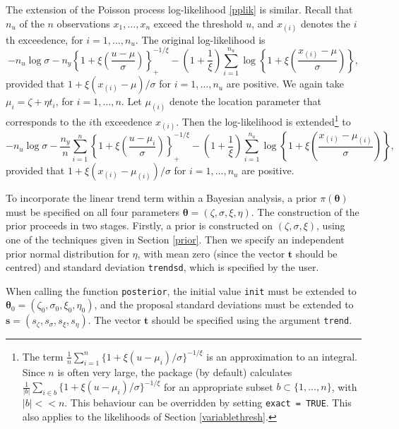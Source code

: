 \documentclass[11pt,a4paper]{article}
\newcommand{\bs}{\boldsymbol}
\begin{document}
The extension of the Poisson process log-likelihood \eqref{pplik} is similar.
Recall that $n_u$ of the $n$ observations $x_1,\dots,x_n$ exceed the threshold $u$, and $x_{(i)}$ denotes the $i$th exceedence, for $i=1,\dots,n_u$.
The original log-likelihood is
\begin{equation}
-n_u\log \sigma - n_y\left\{1 + \xi\left(\frac{u-\mu}{\sigma}\right)\right\}_{+}^{-1/\xi} - \left(1+\frac{1}{\xi}\right) \sum_{i=1}^{n_u} \log\left\{1 + \xi\left(\frac{x_{(i)}-\mu}{\sigma}\right)\right\},
\label{pplik2}
\end{equation}
provided that $1 + \xi(x_{(i)}-\mu)/\sigma$ for $i=1,\dots,n_u$ are positive.
We again take $\mu_i = \zeta + \eta t_i$, for $i=1,\dots,n$.
Let $\mu_{(i)}$ denote the location parameter that corresponds to the $i$th exceedence $x_{(i)}$.
Then the log-likelihood is extended\footnote{The term $\frac{1}{n} \sum_{i=1}^{n} \{1 + \xi(u-\mu_{i})/\sigma \}^{-1/\xi}$ is an approximation to an integral. Since $n$ is often very large, the package (by default) calculates $\frac{1}{|b|} \sum_{i \in b} \{1 + \xi(u-\mu_{i})/\sigma \}^{-1/\xi}$ for an appropriate subset $b \subset \{1,\dots,n\}$, with $|b| << n$.
This behaviour can be overridden by setting \texttt{exact = TRUE}.
This also applies to the likelihoods of Section \ref{variablethresh}.} to
\begin{equation*}
-n_u\log \sigma - \frac{n_y}{n} \sum_{i=1}^{n} \left\{1 + \xi\left(\frac{u-\mu_{i}}{\sigma}\right)\right\}_{+}^{-1/\xi} - \left(1+\frac{1}{\xi}\right) \sum_{i=1}^{n_u} \log\left\{1 + \xi\left(\frac{x_{(i)}-\mu_{(i)}}{\sigma}\right)\right\},
\end{equation*}
provided that $1 + \xi(x_{(i)}-\mu_{(i)})/\sigma$ for $i=1,\dots,n_u$ are positive.

To incorporate the linear trend term within a Bayesian analysis, a prior $\pi(\bs{\theta})$ must be specified on all four parameters $\bs{\theta} = (\zeta,\sigma,\xi,\eta)$.
The construction of the prior proceeds in two stages.
Firstly, a prior is constructed on $(\zeta,\sigma,\xi)$, using one of the techniques given in Section \ref{prior}.
Then we specify an independent prior normal distribution for $\eta$, with mean zero (since the vector $\bs{t}$ should be centred) and standard deviation \verb+trendsd+, which is specified by the user.

When calling the function \verb+posterior+, the initial value \verb+init+ must be extended to $\bs{\theta}_0 = (\zeta_0,\sigma_0,\xi_0,\eta_0)$, and the proposal standard deviations must be extended to $\bs{s} = (s_\zeta,s_\sigma,s_\xi,s_\eta)$.
The vector $\bs{t}$ should be specified using the argument \verb+trend+.
\end{document}

